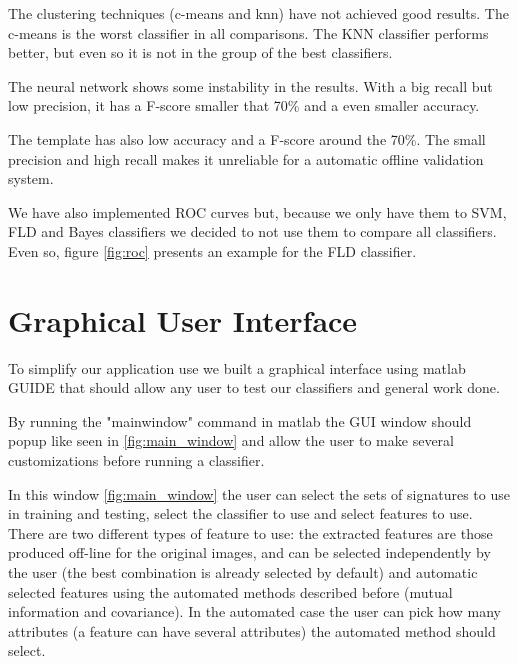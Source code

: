 \documentclass[12pt,a4paper]{report}
\begin{document}
				The clustering techniques (c-means and knn) have not achieved good results. The c-means is the worst classifier in all comparisons. The KNN classifier performs better, but even so it is not in the group of the best classifiers.
				
				The neural network shows some instability in the results. With a big recall but low precision, it has a F-score smaller that 70\% and a even smaller accuracy.
				
				The template has also low accuracy and a F-score around the 70\%. The small precision and high recall makes it unreliable for a automatic offline validation system.
				
			
				
				We have also implemented ROC curves but, because we only have them to SVM, FLD and Bayes classifiers we decided to not use them to compare all classifiers. Even so, figure \ref{fig:roc} presents an example for the FLD classifier.
			
				
				
				
		\chapter{Graphical User Interface}
		\label{sec:gui}
		To simplify our application use we built a graphical interface using matlab GUIDE that should allow any user to test our classifiers and general work done.

		By running the "mainwindow" command in matlab the GUI window should popup like seen in \ref{fig:main_window} and allow the user to make several customizations before running a classifier.
		

		In this window \ref{fig:main_window} the user can select the sets of signatures to use in training and testing, select the classifier to use and select features to use. There are two different types of feature to use: the extracted features are those produced off-line for the original images, and can be selected independently by the user (the best combination is already selected by default) and automatic selected features using the automated methods described before (mutual information and covariance). In the automated case the user can pick how many attributes (a feature can have several attributes) the automated method should select.
		
\end{document}

